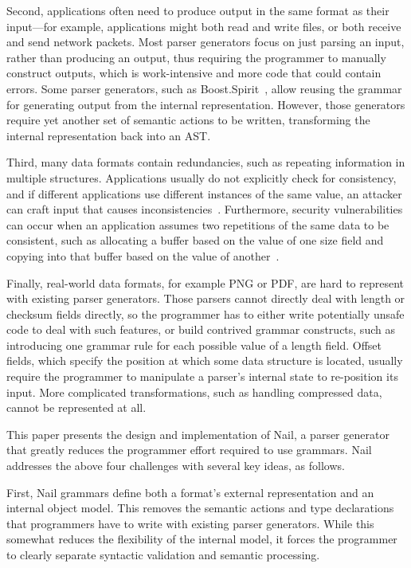 Second,  applications often need to produce output in the same
format as their input---for example, applications might both
read and write files, or both receive and send network packets.
Most parser generators focus on just parsing an input, rather
than producing an output, thus requiring the programmer to manually
construct outputs, which is work-intensive and more code that could contain errors.
Some parser generators, such as
Boost.Spirit~\cite{boost-spirit},
allow reusing the grammar for generating output from the internal
representation.  However, those generators require yet another set of
semantic actions to be written, transforming the internal representation
back into an AST\@.

Third, many data formats contain redundancies, such as repeating
information in multiple structures.  Applications usually do not
explicitly check for consistency, and if different applications use
different instances of the same value, an attacker can craft input that
causes inconsistencies~\cite{evaders6}.  Furthermore, security
vulnerabilities can occur when an application assumes two repetitions
of the same data to be consistent, such as allocating a buffer based on
the value of one size field and copying into that buffer based on the
value of another~\cite{python-bug:20078}.

Finally, real-world data formats, for example PNG or PDF, are hard to
represent with existing parser generators.  Those parsers cannot directly
deal with length or checksum fields directly, so the programmer has to
either write potentially unsafe code to deal with such features, or build
contrived grammar constructs, such as introducing one grammar rule for
each possible value of a length field.  Offset fields, which specify
the position at which some data structure is located, usually require
the programmer to manipulate a parser's internal state to re-position
its input.  More complicated transformations, such as handling compressed
data, cannot be represented at all.



This paper presents the design and implementation of Nail, a parser generator that greatly reduces
the programmer effort required to use grammars. Nail addresses the above four challenges with
several key ideas, as follows.

First, Nail grammars define both a format's external representation and an internal object model.
This removes the semantic actions and type declarations that programmers have to write with existing
parser generators. While this somewhat reduces the flexibility of the internal model, it forces the programmer
to clearly separate syntactic validation and semantic processing.

